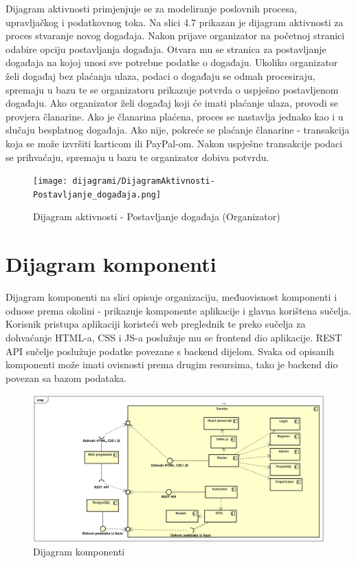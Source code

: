 			Dijagram aktivnosti primjenjuje se za modeliranje poslovnih procesa, upravljačkog i podatkovnog toka. Na slici 4.7 prikazan je dijagram aktivnosti za proces stvaranje novog događaja. Nakon prijave organizator na početnoj stranici odabire opciju postavljanja događaja. Otvara mu se stranica za postavljanje događaja na kojoj unosi sve potrebne podatke o događaju. Ukoliko organizator želi događaj bez plaćanja ulaza, podaci o događaju se odmah procesiraju, spremaju u bazu te se organizatoru prikazuje potvrda o uspješno postavljenom događaju. Ako organizator želi događaj koji će imati plaćanje ulaza, provodi se provjera članarine. Ako je članarina plaćena, proces se nastavlja jednako kao i u slučaju besplatnog događaja. Ako nije, pokreće se plaćanje članarine - transakcija koja se može izvršiti karticom ili PayPal-om. Nakon uspješne transakcije podaci se prihvaćaju, spremaju u bazu te organizator dobiva potvrdu.
			
			\begin{figure}[H]
				\texttt{[image: dijagrami/DijagramAktivnosti-Postavljanje\_događaja.png]}
				\centering
				\caption{Dijagram aktivnosti - Postavljanje događaja (Organizator)}
				\label{fig:promjene}
			\end{figure}
			
			\eject
		\section{Dijagram komponenti}
		
		Dijagram komponenti na slici opisuje organizaciju, međuovisnost komponenti i odnose prema okolini - prikazuje komponente aplikacije i glavna korištena sučelja. Korisnik pristupa aplikaciji koristeći web preglednik te preko sučelja za dohvaćanje HTML-a, CSS i JS-a poslužuje mu se frontend dio aplikacije.	REST API sučelje poslužuje podatke povezane s backend dijelom. Svaka od opisanih komponenti može imati ovisnosti prema drugim resursima, tako je backend dio povezan sa bazom podataka.
		
		\begin{figure}[H]
			\includegraphics[scale=0.45]{dijagrami/DijagramKomponenti.png}
			\centering
			\caption{Dijagram komponenti}
			\label{fig:promjene}
		\end{figure}